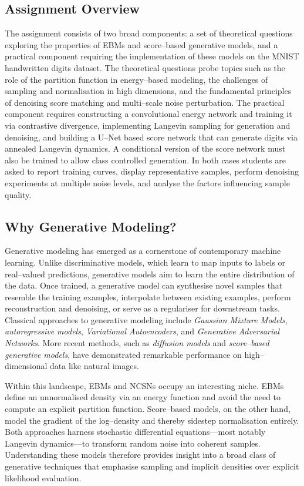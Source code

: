 \subsection{Assignment Overview}

The assignment consists of two broad components: a set of theoretical
questions exploring the properties of EBMs and score–based generative models,
and a practical component requiring the implementation of these models on the
MNIST handwritten digits dataset.  The theoretical questions probe topics
such as the role of the partition function in energy–based modeling, the
challenges of sampling and normalisation in high dimensions, and the
fundamental principles of denoising score matching and multi–scale noise
perturbation.  The practical component requires constructing a convolutional
energy network and training it via contrastive divergence, implementing
Langevin sampling for generation and denoising, and building a U–Net based
score network that can generate digits via annealed Langevin dynamics.  A
conditional version of the score network must also be trained to allow class
controlled generation.  In both cases students are asked to report training
curves, display representative samples, perform denoising experiments at
multiple noise levels, and analyse the factors influencing sample quality.

\subsection{Why Generative Modeling?}

Generative modeling has emerged as a cornerstone of contemporary machine
learning.  Unlike discriminative models, which learn to map inputs to labels
or real–valued predictions, generative models aim to learn the entire
distribution of the data.  Once trained, a generative model can synthesise
novel samples that resemble the training examples, interpolate between
existing examples, perform reconstruction and denoising, or serve as a
regulariser for downstream tasks.  Classical approaches to generative
modeling include \emph{Gaussian Mixture Models}, \emph{autoregressive
models}, \emph{Variational Autoencoders}, and \emph{Generative Adversarial
Networks}.  More recent methods, such as \emph{diffusion models} and
\emph{score–based generative models}, have demonstrated remarkable
performance on high–dimensional data like natural images.

Within this landscape, EBMs and NCSNs occupy an interesting niche.  EBMs
define an unnormalised density via an energy function and avoid the need to
compute an explicit partition function.  Score–based models, on the other
hand, model the gradient of the log–density and thereby sidestep
normalisation entirely.  Both approaches harness stochastic differential
equations—most notably Langevin dynamics—to transform random noise into
coherent samples.  Understanding these models therefore provides insight
into a broad class of generative techniques that emphasise sampling and
implicit densities over explicit likelihood evaluation.

